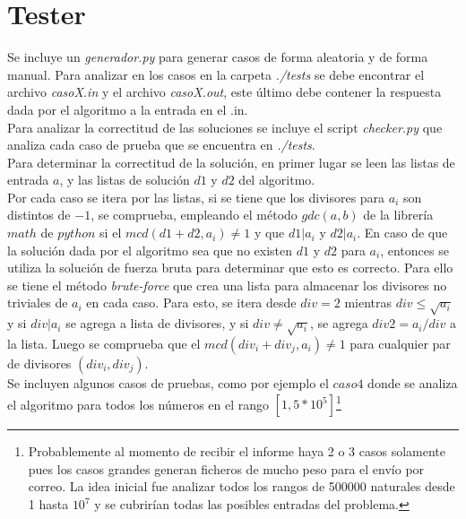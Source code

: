 \documentclass[12pt]{article}
\begin{document}
\section{Tester}

Se incluye un \textit{generador.py} para generar casos de forma aleatoria y de forma manual. Para analizar en los casos en la carpeta 
\textit{./tests} se debe encontrar el archivo \textit{casoX.in} y el archivo \textit{casoX.out}, este \'ultimo debe contener la respuesta 
dada por el algoritmo a la entrada en el .in.\\
Para analizar la correctitud de las soluciones se incluye el script \textit{checker.py} que analiza cada caso de prueba que se encuentra en 
\textit{./tests}.\\
Para determinar la correctitud de la soluci\'on, en primer lugar se leen las listas de entrada $a$, y las listas de soluci\'on $d1$ y $d2$ 
del algoritmo.\\
Por cada caso se itera por las listas, si se tiene que los divisores para $a_i$ son distintos de $-1$, se comprueba, empleando el m\'etodo
 $gdc(a,b)$ de la librer\'ia $math$ de $python$ si el $mcd(d1+d2,a_i)\neq 1$ y que $d1|a_i$ y $d2|a_i$. En caso de que la soluci\'on dada por el
 algoritmo sea que no existen $d1$ y $d2$ para $a_i$, entonces se utiliza la soluci\'on de fuerza bruta para determinar que esto es correcto.
 Para ello se tiene el m\'etodo \textit{brute-force} que crea una lista para almacenar los divisores no triviales de $a_i$ en cada caso.
 Para esto, se itera desde $div=2$ mientras $div\leq \sqrt{a_i}$ y si $div|a_i$ se agrega a lista de divisores, y si $div\neq \sqrt{a_i}$, se agrega $div2= a_i/div$ a la lista. Luego se comprueba que el $mcd(div_i + div_j, a_i)\neq 1$ para cualquier par de divisores $(div_i,div_j)$.\\
Se incluyen algunos casos de pruebas, como por ejemplo el $caso4$ donde se analiza el algoritmo para todos los 
n\'umeros en el rango $[1,5*10^5]$\footnote{Probablemente al momento de recibir el informe haya 2 o 3 casos solamente pues los casos grandes generan ficheros de mucho peso para el env\'io por correo. La idea inicial fue analizar todos los rangos de 500000 naturales desde 1 hasta $10^7$ y se cubrir\'ian todas las posibles entradas del problema.}
\end{document}

